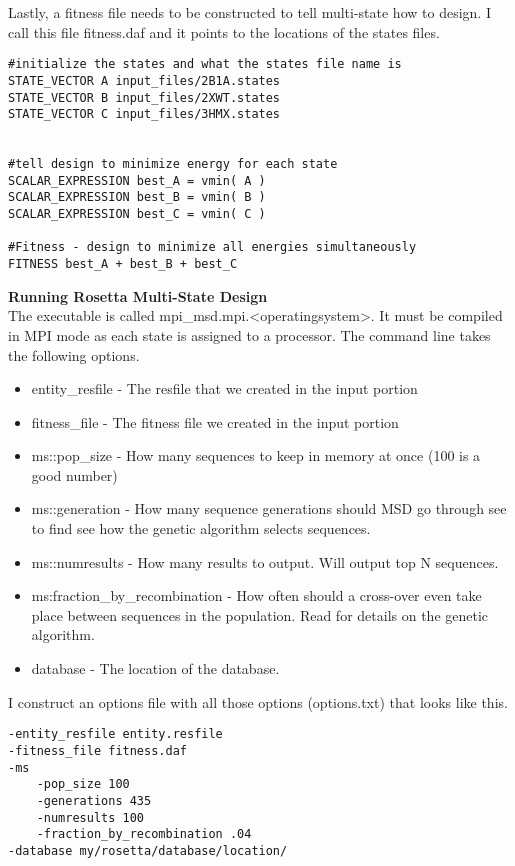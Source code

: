 Lastly, a fitness file needs to be constructed to tell multi-state how to design. I call this file fitness.daf and it points to the locations of the states files.

\begin{lstlisting}[breaklines=true]
#initialize the states and what the states file name is
STATE_VECTOR A input_files/2B1A.states
STATE_VECTOR B input_files/2XWT.states
STATE_VECTOR C input_files/3HMX.states


#tell design to minimize energy for each state
SCALAR_EXPRESSION best_A = vmin( A )
SCALAR_EXPRESSION best_B = vmin( B )
SCALAR_EXPRESSION best_C = vmin( C )

#Fitness - design to minimize all energies simultaneously
FITNESS best_A + best_B + best_C
\end{lstlisting}

\textbf{Running Rosetta Multi-State Design} \\
The \rosetta executable is called mpi\_msd.mpi.<operatingsystem>. It must be compiled in MPI mode as each state is assigned to a processor. The command line takes the following options.

\begin{itemize}
\item entity\_resfile - The resfile that we created in the input portion
\item fitness\_file - The fitness file we created in the input portion
\item ms::pop\_size - How many sequences to keep in memory at once (100 is a good number)
\item ms::generation - How many sequence generations should MSD go through see \citep{LeaverFay:2011ji} to find see how the genetic algorithm selects sequences.
\item ms::numresults - How many results to output. Will output top N sequences.
\item ms:fraction\_by\_recombination - How often should a cross-over even take place between sequences in the population. Read \citep{LeaverFay:2011ji} for details on the genetic algorithm.
\item database - The location of the database.
\end{itemize}

I construct an options file with all those options (options.txt) that looks like this.

\begin{lstlisting}[breaklines=true]
-entity_resfile entity.resfile
-fitness_file fitness.daf
-ms
    -pop_size 100
    -generations 435
    -numresults 100
    -fraction_by_recombination .04
-database my/rosetta/database/location/
\end{lstlisting}

